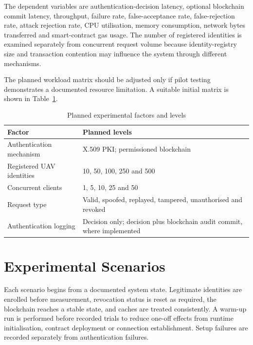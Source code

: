 The dependent variables are authentication-decision latency, optional blockchain commit latency, throughput, failure rate, false-acceptance rate, false-rejection rate, attack rejection rate, CPU utilisation, memory consumption, network bytes transferred and smart-contract gas usage. The number of registered identities is examined separately from concurrent request volume because identity-registry size and transaction contention may influence the system through different mechanisms.

The planned workload matrix should be adjusted only if pilot testing demonstrates a documented resource limitation. A suitable initial matrix is shown in Table~\ref{tab:workload-matrix}.

\begin{table}[htbp]
    \centering
    \caption{Planned experimental factors and levels}
    \label{tab:workload-matrix}
    \begin{tabular}{|p{}|p{}|}
        \hline
        \textbf{Factor} & \textbf{Planned levels} \\
        \hline
        Authentication mechanism & X.509 PKI; permissioned blockchain \\
        \hline
        Registered UAV identities & 10, 50, 100, 250 and 500 \\
        \hline
        Concurrent clients & 1, 5, 10, 25 and 50 \\
        \hline
        Request type & Valid, spoofed, replayed, tampered, unauthorised and revoked \\
        \hline
        Authentication logging & Decision only; decision plus blockchain audit commit, where implemented \\
        \hline
    \end{tabular}
\end{table}

\section{Experimental Scenarios}
\label{sec:experimental-scenarios}

Each scenario begins from a documented system state. Legitimate identities are enrolled before measurement, revocation status is reset as required, the blockchain reaches a stable state, and caches are treated consistently. A warm-up run is performed before recorded trials to reduce one-off effects from runtime initialisation, contract deployment or connection establishment. Setup failures are recorded separately from authentication failures.

